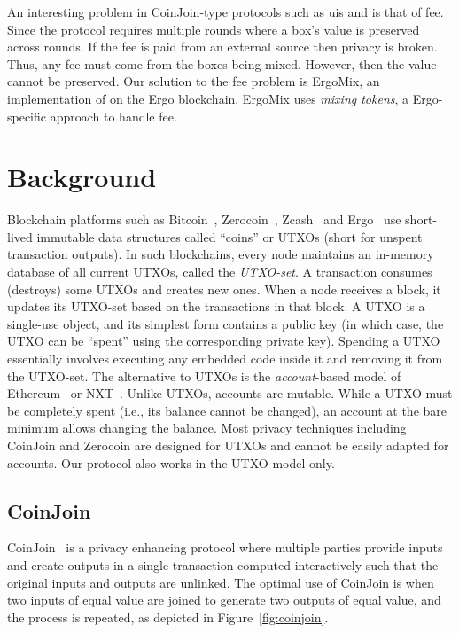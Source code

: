 \documentclass[runningheads]{llncs}
\newcommand{\mixname}{ErgoMix\xspace}
\newcommand{\zerocoin}{Zerocoin\xspace}
\begin{document}
An interesting problem in CoinJoin-type protocols such as uis and \algname is that of fee. Since the protocol requires multiple rounds where a box's value is preserved across rounds. If the fee is paid from an external source then privacy is broken. Thus, any fee must come from the boxes being mixed. However, then the value cannot be preserved.
Our solution to the fee problem is \mixname, an implementation of \algname on the Ergo blockchain. \mixname uses {\em mixing tokens}, a Ergo-specific approach to handle fee. 


\section{Background}

Blockchain platforms such as Bitcoin~\cite{Nak08}, \zerocoin~\cite{zerocoin}, Zcash~\cite{zcash} and Ergo~\cite{ergo} use short-lived immutable data structures called ``coins'' or UTXOs (short for {unspent transaction outputs}). In such blockchains, every node maintains an in-memory database of all current UTXOs, called the {\em UTXO-set}. A transaction consumes (destroys) some UTXOs and creates new ones. When a node receives a block, it updates its UTXO-set based on the transactions in that block. A UTXO is a single-use object, and its simplest form contains a public key (in which case, the UTXO can be ``spent'' using the corresponding private key). Spending a UTXO essentially involves executing any embedded code inside it and removing it from the UTXO-set. 
The alternative to UTXOs is the {\em account}-based model of Ethereum~\cite{wood2014ethereum} or NXT~\cite{nxt}. Unlike UTXOs, accounts are mutable. While a UTXO must be completely spent (i.e., its balance cannot be changed), an account at the bare minimum allows changing the balance. Most privacy techniques including CoinJoin and \zerocoin are designed for UTXOs and cannot be easily adapted for accounts. Our protocol also works in the UTXO model only. 

\subsection{CoinJoin} 
\label{coinjoin}
CoinJoin~\cite{coinjoin} is a privacy enhancing protocol where multiple parties provide inputs and create outputs in a single transaction computed interactively such that the original inputs and outputs are unlinked. The optimal use of CoinJoin is when two inputs of equal value are joined to generate two outputs of equal value, and the process is repeated, as depicted in Figure~\ref{fig:coinjoin}. 
\end{document}
